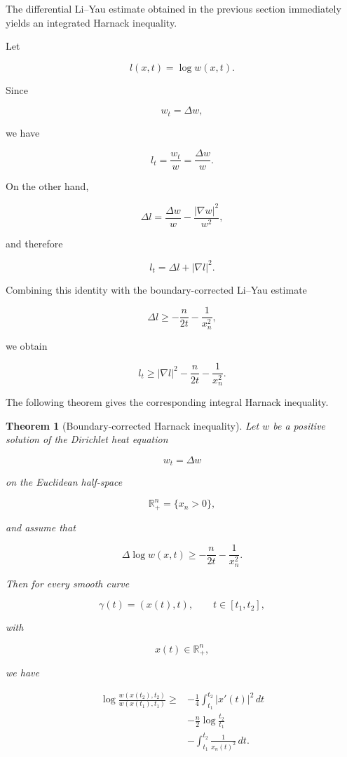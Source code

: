 \documentclass[11pt]{amsart}
\newtheorem{theorem}{Theorem}[section]
\theoremstyle{definition}
\theoremstyle{remark}
\begin{document}
The differential Li--Yau estimate obtained in the previous section
immediately yields an integrated Harnack inequality.

Let

\[
l(x,t)=\log w(x,t).
\]

Since

\[
w_t=\Delta w,
\]

we have

\[
l_t
=
\frac{w_t}{w}
=
\frac{\Delta w}{w}.
\]

On the other hand,

\[
\Delta l
=
\frac{\Delta w}{w}
-
\frac{|\nabla w|^2}{w^2},
\]

and therefore

\[
l_t
=
\Delta l+|\nabla l|^2 .
\]


Combining this identity with the boundary-corrected Li--Yau
estimate

\[
\Delta l
\geq
-\frac n{2t}
-\frac1{x_n^2},
\]

we obtain

\[
l_t
\geq
|\nabla l|^2
-\frac n{2t}
-\frac1{x_n^2}.
\]


The following theorem gives the corresponding integral Harnack
inequality.


\begin{theorem}[Boundary-corrected Harnack inequality]

Let $w$ be a positive solution of the Dirichlet heat equation

\[
w_t=\Delta w
\]

on the Euclidean half-space

\[
\mathbb R^n_+
=
\{x_n>0\},
\]

and assume that

\[
\Delta\log w(x,t)
\geq
-\frac n{2t}
-\frac1{x_n^2}.
\]

Then for every smooth curve

\[
\gamma(t)=(x(t),t),
\qquad
t\in[t_1,t_2],
\]

with

\[
x(t)\in\mathbb R^n_+,
\]

we have

\[
\begin{aligned}
\log
\frac{w(x(t_2),t_2)}
     {w(x(t_1),t_1)}
\geq&
-\frac14
\int_{t_1}^{t_2}
|x'(t)|^2\,dt
\\
&-\frac n2
\log\frac{t_2}{t_1}
\\
&-
\int_{t_1}^{t_2}
\frac1{x_n(t)^2}\,dt .
\end{aligned}
\]

\end{theorem}
\end{document}
